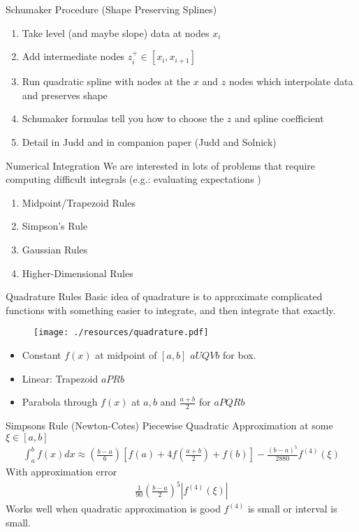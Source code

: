 \begin{frame}{Schumaker Procedure (Shape Preserving Splines)}
\begin{enumerate}
\item Take level (and maybe slope) data at nodes $x_i$
\item Add intermediate nodes $z_i^{+} \in [x_i,x_{i+1}]$
\item Run quadratic spline with nodes at the $x$ and $z$ nodes which interpolate data and preserves shape
\item Schumaker formulas tell you how to choose the $z$ and spline coefficient
\item Detail in Judd and in companion paper (Judd and Solnick)
\end{enumerate}
\end{frame}


\begin{frame}{Numerical Integration}
We are interested in lots of problems that require computing difficult integrals (e.g.: evaluating expectations )
\begin{enumerate}
\item Midpoint/Trapezoid Rules
\item Simpson's Rule
\item Gaussian Rules
\item Higher-Dimensional Rules
\end{enumerate}
\end{frame}


\begin{frame}{Quadrature Rules}
Basic idea of quadrature is to approximate complicated functions with something easier to integrate, and then integrate that exactly.\\
\begin{figure}[htbp]
\begin{center}
\texttt{[image: ./resources/quadrature.pdf]}
\end{center}
\end{figure}
\begin{itemize}
\item Constant $f(x)$ at midpoint of $[a,b]$ $aUQVb$ for box.
\item Linear: Trapezoid $a PRb$
\item Parabola through $f(x)$ at $a,b$ and $\frac{a+b}{2}$ for $aPQRb$
\end{itemize}
\end{frame}

\begin{frame}{Simpsons Rule (Newton-Cotes)}
Piecewise Quadratic Approximation at some $\xi \in[a,b]$
\begin{eqnarray*}
\int_{a}^b f(x) d x \approx \left(\frac{b-a}{6} \right) \left[f(a) + 4f \left( \frac{a+b}{2} \right) + f(b) \right]  - \frac{(b-a)^5}{2880} f^{(4)} (\xi)
\end{eqnarray*}
With approximation error
\begin{eqnarray*}
\frac{1}{90} \left( \frac{b-a}{2}\right)^5 | f^{(4)} (\xi) |
\end{eqnarray*}
Works well when quadratic approximation is good $f^{(4)}$ is small or interval is small.
\end{frame}

